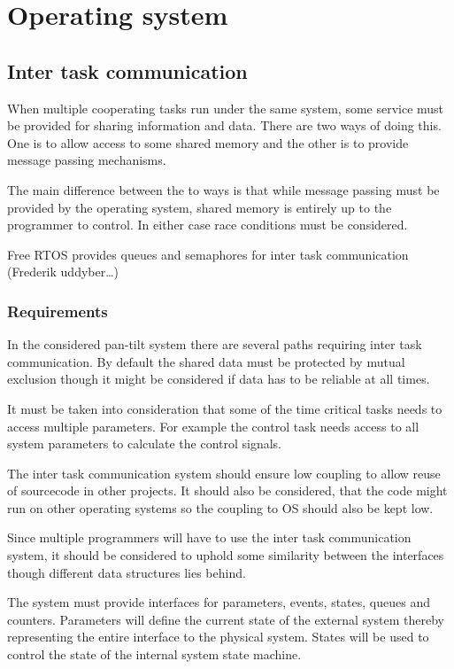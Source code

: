 \chapter{Operating system}\label{chap:os}

\section{Inter task communication}
When multiple cooperating tasks run under the same system, some service must be
provided for sharing information and data. There are two ways of doing this. One
is to allow access to some shared memory and the other is to provide message
passing mechanisms.

The main difference between the to ways is that while message passing must be
provided by the operating system, shared memory is entirely up to the programmer
to control. In either case race conditions must be considered.

Free RTOS provides queues and semaphores for inter task communication (Frederik
uddyber\ldots)

\subsection{Requirements}
In the considered pan-tilt system there are several paths requiring inter task
communication. By default the shared data must be protected by mutual exclusion
though it might be considered if data has to be reliable at all times.

 It must be taken into consideration that some of the time critical tasks needs
 to access multiple parameters. For example the control task needs access to all
 system parameters to calculate the control signals.
 
 The inter task communication system should ensure low coupling to allow reuse
 of sourcecode in other projects. It should also be considered, that the code
 might run on other operating systems so the coupling to OS should also be kept
 low.
 
 Since multiple programmers will have to use the inter task communication
 system, it should be considered to uphold some similarity between the
 interfaces though different data structures lies behind.
 
 The system must provide interfaces for parameters, events, states, queues
and counters. Parameters will define the current state of the external system
thereby representing the entire interface to the physical system. States will be
used to control the state of the internal system state machine.

